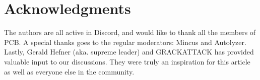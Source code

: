 \documentclass[12pt]{article}
\begin{document}






\section*{Acknowledgments}
The authors are all active in Discord, and would like to thank all the members of PCB. A special thanks goes to the regular moderators: Mincus and Autolyzer. Lastly, Gerald Hefner (aka. supreme leader) and GRACKATTACK has provided valuable input to our discussions. They were truly an inspiration for this article as well as everyone else in the community.


\clearpage
\end{document}
